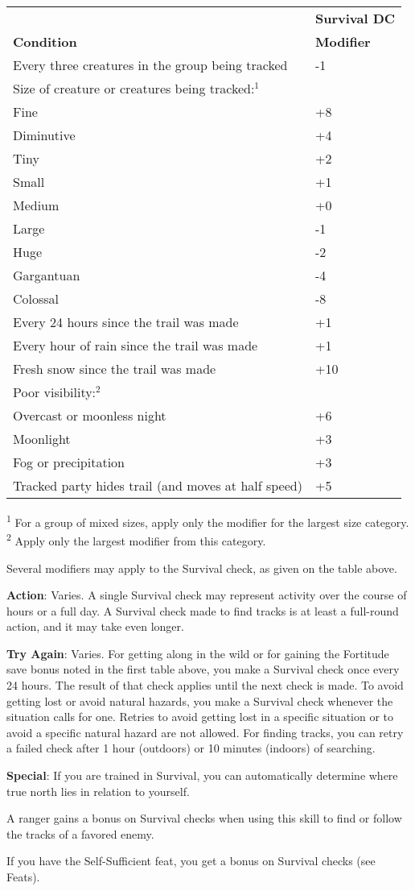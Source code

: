 \begin{table}
 \sffamily
 \begin{tabular}{ll}
                   & \textbf{Survival DC}\\
\textbf{Condition} & \textbf{Modifier}\\
Every three creatures in the group being tracked & -1\\
Size of creature or creatures being tracked:\(^{1}\) \\
Fine & +8\\
Diminutive & +4\\
Tiny & +2\\
Small & +1\\
Medium & +0\\
Large & -1\\
Huge & -2\\
Gargantuan & -4\\
Colossal & -8\\
Every 24 hours since the trail was made & +1\\
Every hour of rain since the trail was made & +1\\
Fresh snow since the trail was made & +10\\
Poor visibility:\(^{2}\) & \\
Overcast or moonless night & +6\\
Moonlight & +3\\
Fog or precipitation & +3\\
Tracked party hides trail (and moves at half speed) & +5\\
 \end{tabular}
\textsuperscript{1} For a group of mixed sizes, apply only the modifier for the largest size category.
\textsuperscript{2} Apply only the largest modifier from this category.
\end{table}

			
Several modifiers may apply to the Survival check, as given on the table above.
				
\textbf{Action}: Varies. A single Survival check may represent activity over the course of hours or a full day. A Survival check made to find tracks is at least a full-round action, and it may take even longer.
				
\textbf{Try Again}: Varies. For getting along in the wild or for gaining the Fortitude save bonus noted in the first table above, you make a Survival check once every 24 hours. The result of that check applies until the next check is made. To avoid getting lost or avoid natural hazards, you make a Survival check whenever the situation calls for one. Retries to avoid getting lost in a specific situation or to avoid a specific natural hazard are not allowed. For finding tracks, you can retry a failed check after 1 hour (outdoors) or 10 minutes (indoors) of searching.
				
\textbf{Special}: If you are trained in Survival, you can automatically determine where true north lies in relation to yourself.
				
A ranger gains a bonus on Survival checks when using this skill to find or follow the tracks of a favored enemy.
				
If you have the Self-Sufficient feat, you get a bonus on Survival checks (see Feats).
